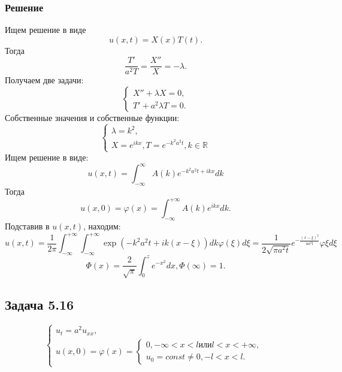 \documentclass[11pt]{article}
\newcounter{th}\setcounter{th}{0}
\begin{document}
\subsubsection{Решение}
\label{sec:orgd7e3930}
Ищем решение в виде
\begin{equation}
u(x, t) = X(x)T(t).
\end{equation}
Тогда
\begin{equation}
\frac{T'}{a^2T} = \frac{X''}{X} = -\lambda.
\end{equation}
Получаем две задачи:
\begin{equation}
\begin{cases}
X'' + \lambda X = 0, \\
T' + a^2\lambda T = 0.
\end{cases}
\end{equation}
Собственные значения и собственные функции:
\begin{equation}
\begin{cases}
\lambda = k^2, \\
X = e^{ikx}, T = e^{-k^2a^2t}, k \in \mathbb{R}
\end{cases}
\end{equation}
Ищем решение в виде:
\begin{equation}
u(x, t) = \int_{-\infty}^{\infty}A(k)e^{-k^2a^2t + ikx}dk
\end{equation}
Тогда
\begin{equation}
u(x, 0) = \varphi(x) = \int_{-\infty}^{+\infty}A(k)e^{ikx}dk.
\end{equation}
Подставив в $u(x, t)$, находим:
\begin{equation}
u(x, t) = \frac1{2\pi}\int_{-\infty}^{+\infty}\int_{-\infty}^{+\infty}\exp(-k^2a^2t + ik(x - \xi))dk\varphi(\xi)d\xi
= \frac1{2\sqrt{\pi a^2t}}e^{-\frac{(x - \xi)^2}{4a^2t}}\varphi{\xi}d\xi
\end{equation}
\begin{equation}
\Phi(x) = \frac2{\sqrt{\pi}}\int_0^ze^{-x^2}dx, \Phi(\infty) = 1.
\end{equation}
\subsection{Задача 5.16}
\label{sec:org213738f}
\begin{equation}
\begin{cases}
u_t = a^2u_{xx}, \\
u(x, 0) = \varphi(x) = \begin{cases}
0, -\infty < x < l { или } l < x < +\infty, \\
u_0 = const \neq 0, -l < x < l.
\end{cases}
\end{cases}
\end{equation}
\end{document}
